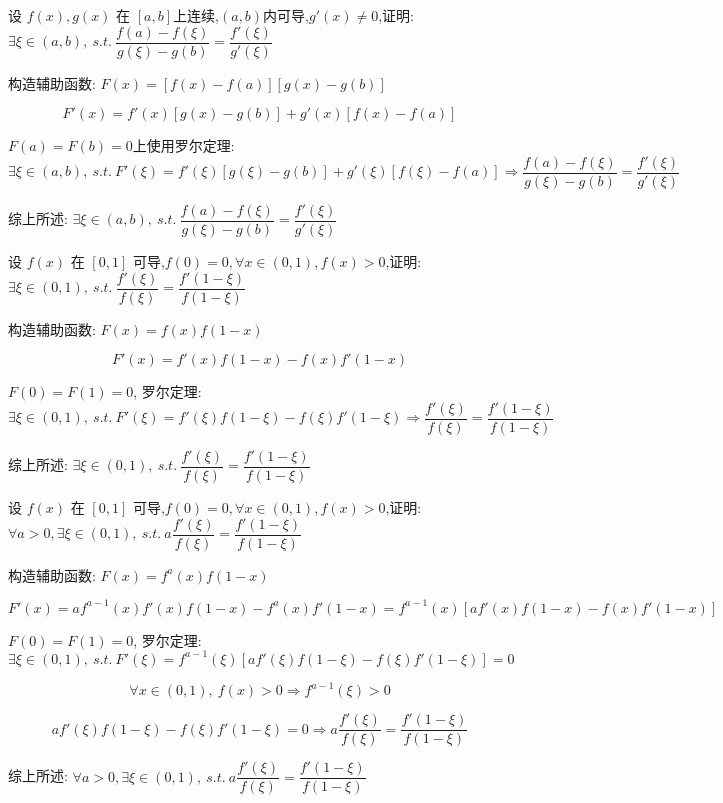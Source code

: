 \begin{proposition}
	设 $f(x),g(x)$ 在 $[a,b]$上连续,$(a,b)$内可导,$g'(x)\neq 0$,证明: $\exists \xi\in(a,b),\ s.t.\ \dfrac{f(a)-f(\xi)}{g(\xi)-g(b)}=\dfrac{f'(\xi)}{g'(\xi)}$
\end{proposition}
\begin{solution}

	构造辅助函数: $F(x)=[f(x)-f(a)][g(x)-g(b)]$
	
	$$F'(x)=f'(x)[g(x)-g(b)]+g'(x)[f(x)-f(a)]$$

	$F(a) = F(b) = 0$上使用罗尔定理:
	$$\exists \xi\in(a,b),\ s.t.\ F'(\xi)=f'(\xi)[g(\xi)-g(b)]+g'(\xi)[f(\xi)-f(a)]\Rightarrow \dfrac{f(a)-f(\xi)}{g(\xi)-g(b)}=\dfrac{f'(\xi)}{g'(\xi)}$$

	综上所述: $\exists \xi\in(a,b),\ s.t.\ \dfrac{f(a)-f(\xi)}{g(\xi)-g(b)}=\dfrac{f'(\xi)}{g'(\xi)}$
\end{solution}

\begin{proposition}
	设 $f(x)$ 在 $[0,1]$ 可导,$f(0)=0, \forall x\in(0,1),f(x)>0$,证明: $\exists \xi\in(0,1),\ s.t.\ \dfrac{f'(\xi)}{f(\xi)}=\dfrac{f'(1-\xi)}{f(1-\xi)}$
\end{proposition}
\begin{solution}

	构造辅助函数: $F(x)=f(x)f(1-x)$

	$$F'(x)=f'(x)f(1-x)-f(x)f'(1-x)$$

	$F(0) = F(1) = 0$, 罗尔定理:
	$$\exists\xi\in(0,1),\ s.t.\ F'(\xi)=f'(\xi)f(1-\xi)-f(\xi)f'(1-\xi)\Rightarrow \dfrac{f'(\xi)}{f(\xi)}=\dfrac{f'(1-\xi)}{f(1-\xi)}$$

	综上所述: $\exists \xi\in(0,1),\ s.t.\ \dfrac{f'(\xi)}{f(\xi)}=\dfrac{f'(1-\xi)}{f(1-\xi)}$
\end{solution}

\begin{proposition}
	设 $f(x)$ 在 $[0,1]$ 可导,$f(0)=0,\forall x\in(0,1),f(x)>0$,证明: $\forall a>0,\exists \xi\in(0,1),\ s.t.\ a\dfrac{f'(\xi)}{f(\xi)}=\dfrac{f'(1-\xi)}{f(1-\xi)}$
\end{proposition}
\begin{solution}

	构造辅助函数: $F(x)=f^{a}(x)f(1-x)$

	$$F'(x)=af^{a-1}(x)f'(x)f(1-x)-f^{a}(x)f'(1-x)=f^{a-1}(x)[af'(x)f(1-x)-f(x)f'(1-x)]$$

	$F(0) = F(1) = 0$, 罗尔定理:
	$$\exists\xi\in(0,1),\ s.t.\ F'(\xi)=f^{a-1}(\xi)[af'(\xi)f(1-\xi)-f(\xi)f'(1-\xi)]=0$$

	$$\forall x\in(0,1),\ f(x)>0\Rightarrow f^{a-1}(\xi)>0$$

	$$af'(\xi)f(1-\xi)-f(\xi)f'(1-\xi)=0\Rightarrow a\dfrac{f'(\xi)}{f(\xi)}=\dfrac{f'(1-\xi)}{f(1-\xi)}$$

	综上所述: $\forall a>0,\exists \xi\in(0,1),\ s.t.\ a\dfrac{f'(\xi)}{f(\xi)}=\dfrac{f'(1-\xi)}{f(1-\xi)}$
\end{solution}

